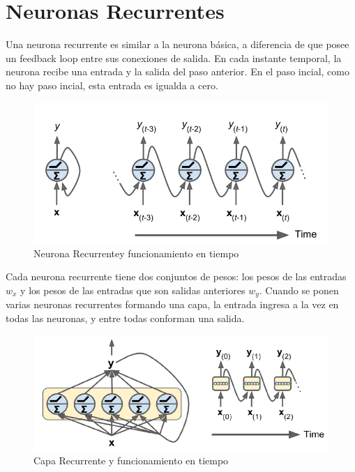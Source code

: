 \section{Neuronas Recurrentes}

Una neurona recurrente es similar a la neurona básica, a diferencia de que posee un feedback loop entre sus conexiones de salida.  En cada instante temporal, la neurona recibe una entrada y la salida del paso anterior. En el paso incial, como no hay paso incial, esta entrada es igualda a cero. 

\begin{figure}[h]
	\centering
	\includegraphics[scale=0.5]{images/neurona_recurrente.png}
	\caption{Neurona Recurrentey funcionamiento en tiempo}
	\label{fig:neurona}
\end{figure}

Cada neurona recurrente tiene dos conjuntos de pesos: los pesos de las entradas $w_{x}$ y los pesos de las entradas que son salidas anteriores $w_y$. Cuando se ponen varias neuronas recurrentes formando una capa, la entrada ingresa a la vez en todas las neuronas, y entre todas conforman una salida. 

\begin{figure}[h]
	\centering
	\includegraphics[scale=0.5]{images/capa_recurrente.png}
	\caption{Capa Recurrente y funcionamiento en tiempo}
	\label{fig:capa}
\end{figure}


